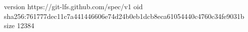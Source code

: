 version https://git-lfs.github.com/spec/v1
oid sha256:761777dec11c7a441446606e74d24b0eb1dcb8eca61054440c4760c34fe9031b
size 12384
